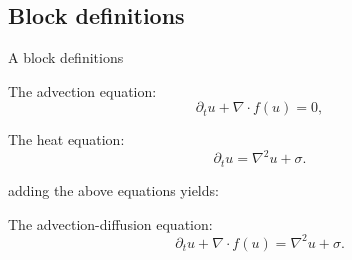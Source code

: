 \documentclass[handout]{beamer} %
\begin{document}
\subsection{Block definitions}
\begin{frame}{A block definitions}
    \begin{block}{The advection equation:}
        \begin{equation}
            \partial_{t} u + \nabla\cdot f(u) = 0,
        \end{equation}
    \end{block}
    \pause
    \begin{alertblock}{The heat equation:}
        \begin{equation}
            \partial_{t} u = \nabla^2 u + \sigma.
        \end{equation}
    \end{alertblock}
    \pause
    adding the above equations yields:
    \pause
    \begin{exampleblock}{The advection-diffusion equation:}
        \begin{equation}
            \partial_{t} u + \nabla\cdot f(u) = \nabla^2 u + \sigma.
        \end{equation}
    \end{exampleblock}
\end{frame}
\end{document}
